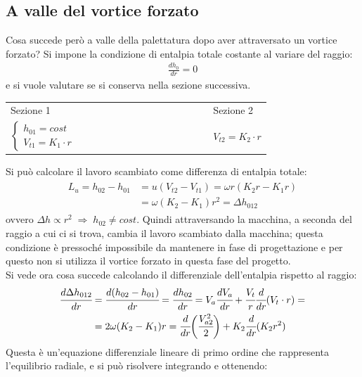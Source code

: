 \subsection{A valle del vortice forzato}
Cosa succede però a valle della palettatura dopo aver attraversato un vortice forzato? Si impone la condizione di entalpia totale costante al variare del raggio:
\begin{align*}
\frac{dh_{0}}{dr} = 0
\end{align*}
e si vuole valutare se si conserva nella sezione successiva.
\begin{center}
\begin{tabular}{l l l l l l l l l l l l l l l}
	Sezione 1 & & & & & & & & & & & & & & Sezione 2\\
	$
	\begin{cases}
		h_{01} = cost\\
		V_{t1} = K_1 \cdot r
	\end{cases}$ & & & & & & & & & & & & & & $V_{t2} = K_2 \cdot r$
\end{tabular}
\end{center}
Si può calcolare il lavoro scambiato come differenza di entalpia totale:
\begin{align*}
\begin{split}
L_u=h_{02} - h_{01} &= u (V_{t2} - V_{t1} ) = \omega r (K_2 r - K_1 r) \\
&= \omega (K_2 - K_1) r^2 = \Delta h_{012}
\end{split}
\end{align*}
ovvero $\Delta h \propto r^2 \; \Rightarrow \; h_{02} \neq  cost$. Quindi attraversando la macchina, a seconda del raggio a cui ci si trova, cambia il lavoro scambiato dalla macchina; questa condizione è pressoché impossibile da mantenere in fase di progettazione e per questo non si utilizza il vortice forzato in questa fase del progetto.\\
Si vede ora cosa succede calcolando il differenziale dell'entalpia rispetto al raggio:
\begin{align*}
\begin{split}
\cfrac{d \Delta h_{012}}{dr} &= \cfrac{d ( h_{02}-h_{01})}{dr} = \cfrac{dh_{02}}{dr} = V_a \cfrac{dV_a}{dr} + \cfrac{V_t}{r} \cfrac{d}{dr} (V_t \cdot r) = \\
& =2 \omega (K_2 - K_1) r = \cfrac{d}{dr} \bigg( \cfrac{V_{a2}^2}{2} \bigg) + K_2 \cfrac{d}{dr} (K_2 r^2)
\end{split}
\end{align*}
Questa è un'equazione differenziale lineare di primo ordine che rappresenta l'equilibrio radiale, e si può risolvere integrando e ottenendo:
